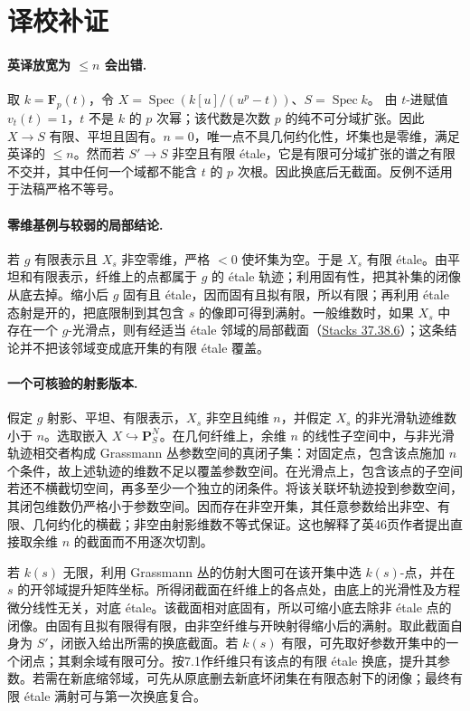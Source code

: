 \documentclass[openany,fontset=fandol]{ctexbook}
\DeclareMathOperator{\Spec}{Spec}
\begin{document}
\section*{译校补证}
\paragraph{英译放宽为 $\le n$ 会出错.}
取 $k=\mathbf F_p(t)$，令 $X=\Spec(k[u]/(u^p-t))$、$S=\Spec k$。
由 $t$-进赋值 $v_t(t)=1$，$t$ 不是 $k$ 的 $p$ 次幂；该代数是次数 $p$ 的纯不可分域扩张。因此 $X\to S$ 有限、平坦且固有。$n=0$，唯一点不具几何约化性，坏集也是零维，满足英译的 $\le n$。然而若 $S'\to S$ 非空且有限 étale，它是有限可分域扩张的谱之有限不交并，其中任何一个域都不能含 $t$ 的 $p$ 次根。因此换底后无截面。反例不适用于法稿严格不等号。

\paragraph{零维基例与较弱的局部结论.}
若 $g$ 有限表示且 $X_s$ 非空零维，严格 $<0$ 使坏集为空。于是 $X_s$ 有限 étale。由平坦和有限表示，纤维上的点都属于 $g$ 的 étale 轨迹；利用固有性，把其补集的闭像从底去掉。缩小后 $g$ 固有且 étale，因而固有且拟有限，所以有限；再利用 étale 态射是开的，把底限制到其包含 $s$ 的像即可得到满射。一般维数时，如果 $X_s$ 中存在一个 $g$-光滑点，则有经适当 étale 邻域的局部截面（\href{https://stacks.math.columbia.edu/tag/055U}{Stacks 37.38.6}）；这条结论并不把该邻域变成底开集的有限 étale 覆盖。

\paragraph{一个可核验的射影版本.}
假定 $g$ 射影、平坦、有限表示，$X_s$ 非空且纯维 $n$，并假定 $X_s$ 的非光滑轨迹维数小于 $n$。选取嵌入 $X\hookrightarrow\mathbf P^N_S$。在几何纤维上，余维 $n$ 的线性子空间中，与非光滑轨迹相交者构成 Grassmann 丛参数空间的真闭子集：对固定点，包含该点施加 $n$ 个条件，故上述轨迹的维数不足以覆盖参数空间。在光滑点上，包含该点的子空间若还不横截切空间，再多至少一个独立的闭条件。将该关联坏轨迹投到参数空间，其闭包维数仍严格小于参数空间。因而存在非空开集，其任意参数给出非空、有限、几何约化的横截；非空由射影维数不等式保证。这也解释了英46页作者提出直接取余维 $n$ 的截面而不用逐次切割。

若 $k(s)$ 无限，利用 Grassmann 丛的仿射大图可在该开集中选 $k(s)$-点，并在 $s$ 的开邻域提升矩阵坐标。所得闭截面在纤维上的各点处，由底上的光滑性及方程微分线性无关，对底 étale。该截面相对底固有，所以可缩小底去除非 étale 点的闭像。由固有且拟有限得有限，由非空纤维与开映射得缩小后的满射。取此截面自身为 $S'$，闭嵌入给出所需的换底截面。若 $k(s)$ 有限，可先取好参数开集中的一个闭点；其剩余域有限可分。按7.1作纤维只有该点的有限 étale 换底，提升其参数。若需在新底缩邻域，可先从原底删去新底坏闭集在有限态射下的闭像；最终有限 étale 满射可与第一次换底复合。
\end{document}
